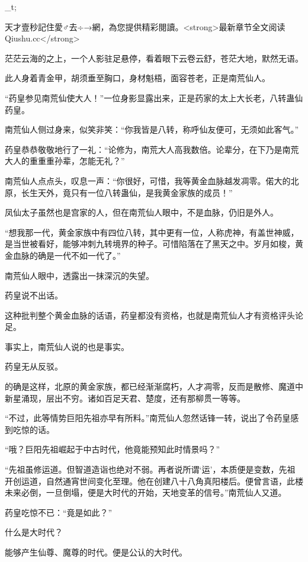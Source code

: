 
\begin{this_body}

\_t;

天才壹秒記住愛♂去÷→網，為您提供精彩閱讀。<strong>最新章节全文阅读Qiushu.cc</strong>

茫茫云海的之上，一个人影驻足悬停，看着眼下云卷云舒，苍茫大地，默然无语。

此人身着青金甲，胡须垂至胸口，身材魁梧，面容苍老，正是南荒仙人。

“药皇参见南荒仙使大人！”一位身影显露出来，正是药家的太上大长老，八转蛊仙药皇。

南荒仙人侧过身来，似笑非笑：“你我皆是八转，称呼仙友便可，无须如此客气。”

药皇恭恭敬敬地行了一礼：“论修为，南荒大人高我数倍。论辈分，在下乃是南荒大人的重重重孙辈，怎能无礼？”

南荒仙人点点头，叹息一声：“你很好，可惜，我等黄金血脉越发凋零。偌大的北原，长生天外，竟只有一位八转蛊仙，是我黄金家族的成员！”

凤仙太子虽然也是宫家的人，但在南荒仙人眼中，不是血脉，仍旧是外人。

“想我那一代，黄金家族中有四位八转，其中更有一位，人称虎神，有盖世神威，是当世被看好，能够冲刺九转境界的种子。可惜陷落在了黑天之中。岁月如梭，黄金血脉的确是一代不如一代了。”

南荒仙人眼中，透露出一抹深沉的失望。

药皇说不出话。

这种批判整个黄金血脉的话语，药皇都没有资格，也就是南荒仙人才有资格评头论足。

事实上，南荒仙人说的也是事实。

药皇无从反驳。

的确是这样，北原的黄金家族，都已经渐渐腐朽，人才凋零，反而是散修、魔道中新星涌现，层出不穷。诸如百足天君、楚度，还有那柳贯一等等。

“不过，此等情势巨阳先祖亦早有所料。”南荒仙人忽然话锋一转，说出了令药皇感到吃惊的话。

“哦？巨阳先祖崛起于中古时代，他竟能预知此时情景吗？”

“先祖虽修运道。但智道造诣也绝对不弱。再者说所谓‘运’，本质便是变数，先祖开创运道，自然通宵世间变化至理。他在创建八十八角真阳楼后。便曾言语，此楼未来必倒，一旦倒塌，便是大时代的开始，天地变革的信号。”南荒仙人又道。

药皇吃惊不已：“竟是如此？”

什么是大时代？

能够产生仙尊、魔尊的时代。便是公认的大时代。


\end{this_body}
